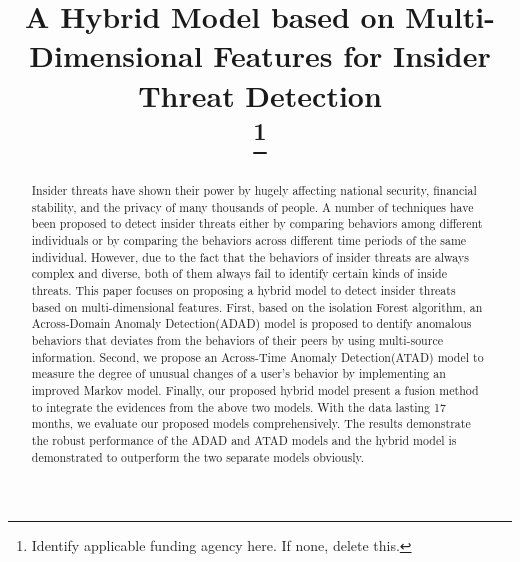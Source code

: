 \documentclass[conference]{IEEEtran}
\begin{document}
\title{A Hybrid Model based on Multi-Dimensional Features for Insider Threat Detection\\
\thanks{Identify applicable funding agency here. If none, delete this.}
}

\author{
\and
{}

}

\maketitle

\begin{abstract}
Insider threats have shown their power by hugely affecting national security, financial stability, and the privacy of many thousands of people.
A number of techniques have been proposed to detect insider threats either by comparing behaviors among different individuals or by comparing the behaviors across different time periods of the same individual. However, due to the  fact that the behaviors of insider threats are always complex and diverse, both of them always fail to identify certain kinds of inside threats.
This paper focuses on proposing a hybrid model to detect insider threats  based on multi-dimensional features.
First, based on the isolation Forest algorithm,  
an Across-Domain Anomaly Detection(ADAD) model is proposed to dentify anomalous behaviors that deviates from the behaviors of their peers by using multi-source information. Second, we propose an Across-Time Anomaly Detection(ATAD) model to measure the degree of unusual changes of a user's behavior  by implementing an improved Markov model. Finally, our proposed hybrid model present a fusion
method to integrate the evidences from the above two models. With the data lasting 17 months, we evaluate our proposed models comprehensively. The results demonstrate the robust performance of the ADAD and ATAD models and the hybrid model is demonstrated to outperform the two separate models obviously.


\end{abstract}
\end{document}
